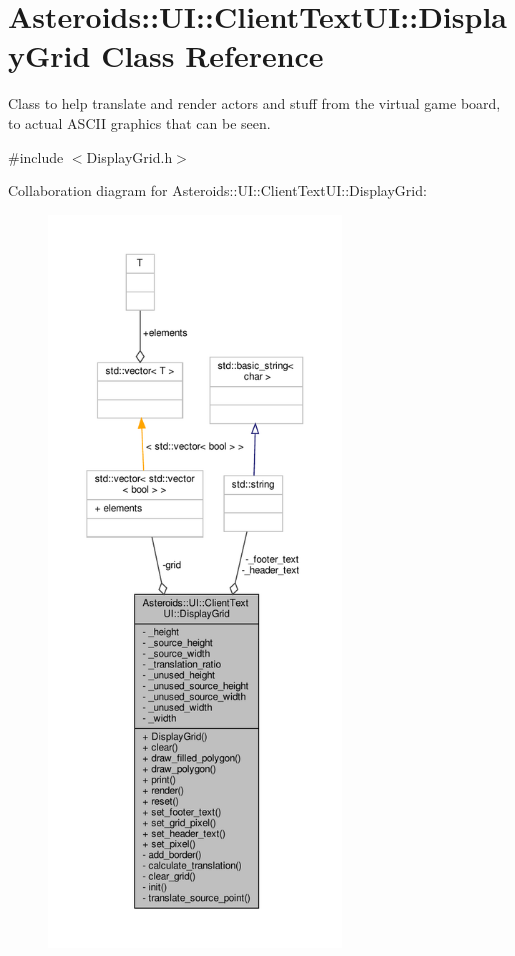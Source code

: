 \hypertarget{classAsteroids_1_1UI_1_1ClientTextUI_1_1DisplayGrid}{}\section{Asteroids\+:\+:UI\+:\+:Client\+Text\+UI\+:\+:Display\+Grid Class Reference}
\label{classAsteroids_1_1UI_1_1ClientTextUI_1_1DisplayGrid}


Class to help translate and render actors and stuff from the virtual game board, to actual A\+S\+C\+II graphics that can be seen.  




{\ttfamily \#include $<$Display\+Grid.\+h$>$}



Collaboration diagram for Asteroids\+:\+:UI\+:\+:Client\+Text\+UI\+:\+:Display\+Grid\+:\nopagebreak
\begin{figure}[H]
\begin{center}
\leavevmode
\includegraphics[height=550pt]{classAsteroids_1_1UI_1_1ClientTextUI_1_1DisplayGrid__coll__graph}
\end{center}
\end{figure}
